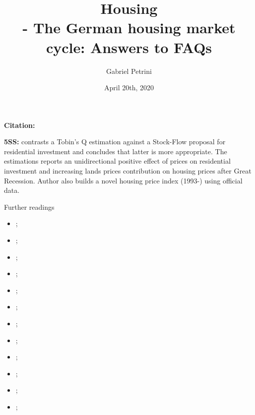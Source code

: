 \documentclass[11pt,lineno]{../_configs}
\title{
\large{Housing}\vspace{2pt}\\
\Huge{\autor - The German housing market cycle: Answers to FAQs}
}
\date{April 20th, 2020}
\author[$\ast$]{Gabriel Petrini}
\affil[$\ast$]{PhD Student at Unicamp.}
\newcommand{\autor}{\textcite{kajuth_german_2020} }
\begin{document}
\maketitle
\articletypemark
\marginmark
\thispagestyle{firststyle}

\noindent \textbf{Citation:} 	

\begin{infobox}
	\textbf{5SS:} \autor contrasts a Tobin's Q estimation against a Stock-Flow proposal for residential investment and concludes that latter is more appropriate. The estimations reports an unidirectional positive effect of prices on residential investment and increasing lands prices contribution on housing prices after Great Recession. Author also builds a novel housing price index (1993-) using official data.
\end{infobox}

\begin{redbox}{Further readings}
	\begin{itemize}
		\item \textcite{dipasquale_housing_1994};
		\item \textcite{lastrapes_real_2002};
		\item \textcite{mccarthy_are_2004};
		\item \textcite{antipa_housing_2009};
		\item \textcite{aspachs-bracons_drivers_2009};	
		\item \textcite{steiner_estimating_2010};
		\item \textcite{koetter_real_2010};
		\item \textcite{sanchez_price_2011};			
		\item \textcite{igan_global_2012};
		\item \textcite{chen_renewed_2013};
		\item \textcite{nocera_house_2018};
		\item \textcite{geng_fundamental_2018};
	\end{itemize}
\end{redbox}

\printbibliography
	
\end{document}
